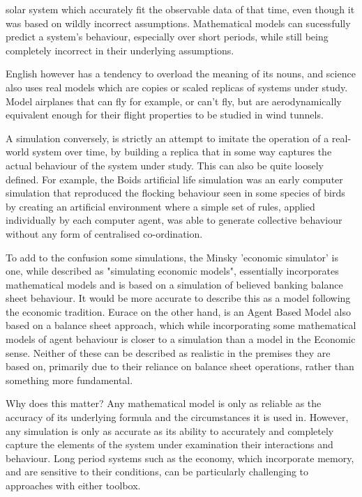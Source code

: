\documentclass[10pt,oneside,openright, a4paper]{memoir}
\begin{document}
solar system which accurately fit the observable data of that time,
even though it was based on wildly incorrect assumptions. Mathematical
models can sucessfully predict a system's behaviour, especially over
short periods, while still being completely incorrect in their 
underlying assumptions.
\par
English however has a tendency to overload the meaning of
its nouns, and science also uses real models which are copies
or scaled replicas of systems under study. Model airplanes
that can fly for example, or can't fly, but are aerodynamically
equivalent enough for their flight properties to be studied
in wind tunnels.
\par
A simulation conversely, is strictly an attempt to imitate
the operation of a real-world system over time, by building a replica
that in some way captures the actual behaviour of the system 
under study. This can also be quite loosely defined. For example, the 
Boids\cite{reynolds.1987} artificial life simulation
was an early computer simulation that reproduced the flocking behaviour
seen in some species of birds by creating an artificial environment 
where a simple set of rules, applied individually by each computer agent,
was able to generate collective behaviour without any form of 
centralised co-ordination.
\par
To add to the confusion some simulations, the Minsky 'economic 
simulator'\cite{keen.2014} is one, while described as "simulating economic
models", essentially incorporates mathematical models and is based on 
a simulation of believed banking balance sheet behaviour. It would be 
more accurate to describe
this as a model following the economic tradition. Eurace on the other
hand, is an Agent Based Model also based on a balance sheet approach,
which while incorporating some mathematical models of agent behaviour
is closer to a simulation than a model in the Economic sense. Neither
of these can be described as realistic in the premises they are based
on, primarily due to their reliance on balance sheet operations,
rather than something more fundamental.
\par
Why does this matter? Any mathematical model is only as reliable as the 
accuracy of its underlying formula and the circumstances it is used in.  
However, any simulation is only as accurate as its ability to accurately
and completely capture the elements of the system under examination
their interactions and behaviour.  Long period systems such as the
economy, which incorporate
memory, and are sensitive to their conditions, can be particularly
challenging to approaches with either toolbox.
\end{document}
